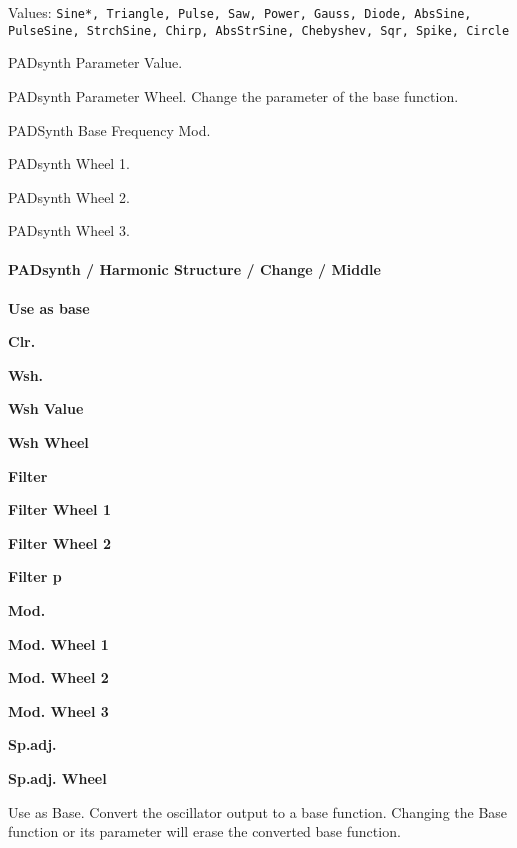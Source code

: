    Values: \texttt{Sine*, Triangle, Pulse, Saw, Power, Gauss, Diode, AbsSine,
           PulseSine, StrchSine, Chirp, AbsStrSine, Chebyshev,
           Sqr, Spike, Circle}

   PADsynth Parameter Value.

   PADsynth Parameter Wheel.
   Change the parameter of the base function. 

   PADSynth Base Frequency Mod.

   PADsynth Wheel 1.

   PADsynth Wheel 2.

   PADsynth Wheel 3.


\paragraph{PADsynth / Harmonic Structure / Change / Middle}
\label{paragraph:padsynth_harmonic_structure_change_middle}

   \begin{enumber}
      \item \textbf{Use as base}
      \item \textbf{Clr.}
      \item \textbf{Wsh.}
      \item \textbf{Wsh Value}
      \item \textbf{Wsh Wheel}
      \item \textbf{Filter}
      \item \textbf{Filter Wheel 1}
      \item \textbf{Filter Wheel 2}
      \item \textbf{Filter p}
      \item \textbf{Mod.}
      \item \textbf{Mod. Wheel 1}
      \item \textbf{Mod. Wheel 2}
      \item \textbf{Mod. Wheel 3}
      \item \textbf{Sp.adj.}
      \item \textbf{Sp.adj. Wheel}
   \end{enumber}

   \setcounter{ItemCounter}{0}      %

   Use as Base.
   Convert the oscillator output to a base function. Changing the Base
   function or its parameter will erase the converted base function. 

